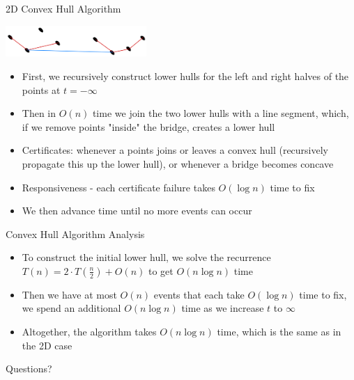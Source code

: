 \documentclass[aspectratio=169, handout]{beamer}
\begin{document}
\begin{frame}{2D Convex Hull Algorithm}
    \begin{center}
        \includegraphics[width=0.4\textwidth]{convex_hull_construction.png}
    \end{center}
    \begin{itemize}
        \item First, we recursively construct lower hulls for the left and right halves of the points at $t = -\infty$
        \pause
        \item Then in $O(n)$ time we join the two lower hulls with a line segment, which, if we remove points "inside" the bridge, creates a lower hull
        \pause
        \item Certificates: whenever a points joins or leaves a convex hull (recursively propagate this up the lower hull), or whenever a bridge becomes concave
        \pause
        \item Responsiveness - each certificate failure takes $O(\log n)$ time to fix
        \pause
        \item We then advance time until no more events can occur
    \end{itemize}
\end{frame}

\begin{frame}{Convex Hull Algorithm Analysis}
    \begin{itemize}
        \item To construct the initial lower hull, we solve the recurrence $T(n) = 2 \cdot T(\frac n 2) + O(n)$ to get $O(n \log n)$ time
        \pause
        \item Then we have at most $O(n)$ events that each take $O(\log n)$ time to fix, we spend an additional $O(n \log n)$ time as we increase $t$ to $\infty$
        \item Altogether, the algorithm takes $O(n \log n)$ time, which is the same as in the 2D case
    \end{itemize}
\end{frame}

\begin{frame}{}
      \begin{center}
    {\color{sigma@mainblue} \LARGE Questions?}
  \end{center}
\end{frame}
\end{document}
